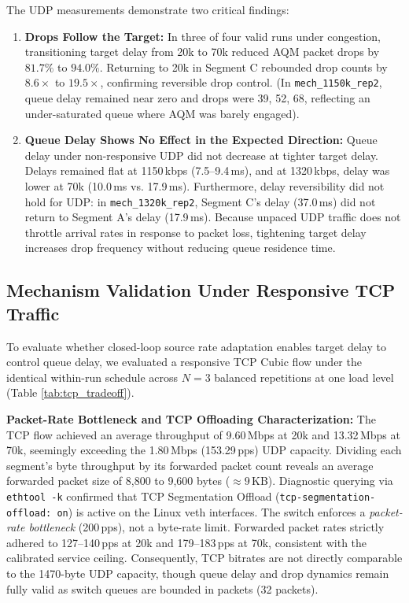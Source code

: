 \documentclass[12pt,a4paper,oneside]{report}
\begin{document}
The UDP measurements demonstrate two critical findings:
\begin{enumerate}[label=\arabic*.]
  \item \textbf{Drops Follow the Target:} In three of four valid runs under congestion, transitioning target delay from 20k to 70k reduced AQM packet drops by $81.7\%$ to $94.0\%$. Returning to 20k in Segment C rebounded drop counts by $8.6\times$ to $19.5\times$, confirming reversible drop control. (In \texttt{mech\_1150k\_rep2}, queue delay remained near zero and drops were 39, 52, 68, reflecting an under-saturated queue where AQM was barely engaged).
  \item \textbf{Queue Delay Shows No Effect in the Expected Direction:} Queue delay under non-responsive UDP did not decrease at tighter target delay. Delays remained flat at 1150\,kbps (7.5--9.4\,ms), and at 1320\,kbps, delay was lower at 70k (10.0\,ms vs. 17.9\,ms). Furthermore, delay reversibility did not hold for UDP: in \texttt{mech\_1320k\_rep2}, Segment C's delay (37.0\,ms) did not return to Segment A's delay (17.9\,ms). Because unpaced UDP traffic does not throttle arrival rates in response to packet loss, tightening target delay increases drop frequency without reducing queue residence time.
\end{enumerate}

\subsection{Mechanism Validation Under Responsive TCP Traffic}
To evaluate whether closed-loop source rate adaptation enables target delay to control queue delay, we evaluated a responsive TCP Cubic flow under the identical within-run schedule across $N=3$ balanced repetitions at one load level (Table \ref{tab:tcp_tradeoff}).



\textbf{Packet-Rate Bottleneck and TCP Offloading Characterization:} 
The TCP flow achieved an average throughput of 9.60\,Mbps at 20k and 13.32\,Mbps at 70k, seemingly exceeding the 1.80\,Mbps (153.29\,pps) UDP capacity. Dividing each segment's byte throughput by its forwarded packet count reveals an average forwarded packet size of 8,800 to 9,600 bytes ($\approx 9$\,KB). Diagnostic querying via \texttt{ethtool -k} confirmed that TCP Segmentation Offload (\texttt{tcp-segmentation-offload: on}) is active on the Linux veth interfaces. The switch enforces a \emph{packet-rate bottleneck} (200\,pps), not a byte-rate limit. Forwarded packet rates strictly adhered to 127--140\,pps at 20k and 179--183\,pps at 70k, consistent with the calibrated service ceiling. Consequently, TCP bitrates are not directly comparable to the 1470-byte UDP capacity, though queue delay and drop dynamics remain fully valid as switch queues are bounded in packets (32 packets).
\end{document}
